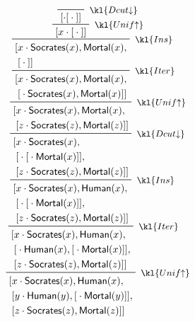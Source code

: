 $$
\R[\kl{Unif{\ua}}]
{\R[\kl{Iter}]
{\R[\kl{Ins}]
{\R[\kl{Dcut{\da}}]
{\R[\kl{Unif{\ua}}]
{\R[\kl{Iter}]
{\R[\kl{Ins}]
{\R[\kl{Unif{\ua}}]
{\R[\kl{Dcut{\da}}]
{}
{[\cdot [{} \cdot {}]]}}
{[x \cdot [{} \cdot {}]]}}
{\begin{aligned}
 [&x \cdot \socrates(x), \mortal(x), \\
  &[{} \cdot {}]]
\end{aligned}}}
{\begin{aligned}
 [&x \cdot \socrates(x), \mortal(x), \\
  &[{} \cdot \socrates(x),\mortal(x)]]
\end{aligned}}}
{\begin{aligned}
 [&x \cdot \socrates(x), \mortal(x), \\
  &[z \cdot \socrates(z),\mortal(z)]]
\end{aligned}}}
{\begin{aligned}
 [&x \cdot \socrates(x), \\
  &[{} \cdot [{} \cdot \mortal(x)]], \\
  &[z \cdot \socrates(z),\mortal(z)]]
\end{aligned}}}
{\begin{aligned}
 [&x \cdot \socrates(x),\human(x), \\
  &[{} \cdot [{} \cdot \mortal(x)]], \\
  &[z \cdot \socrates(z),\mortal(z)]]
\end{aligned}}}
{\begin{aligned}
 [&x \cdot \socrates(x),\human(x), \\
  &[{} \cdot \human(x),[{} \cdot \mortal(x)]], \\
  &[z \cdot \socrates(z),\mortal(z)]]
\end{aligned}}}
{\begin{aligned}
 [&x \cdot \socrates(x),\human(x), \\
  &[y \cdot \human(y),[{} \cdot \mortal(y)]], \\
  &[z \cdot \socrates(z),\mortal(z)]]
\end{aligned}}
$$
